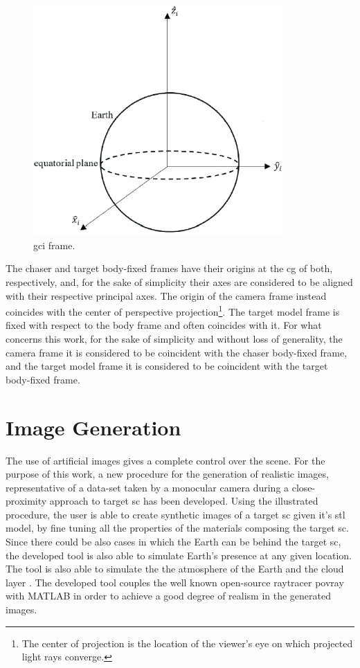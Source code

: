 \begin{figure}[htbp]
  \centering
  \includegraphics[width=0.85\textwidth]{gfx/eci.eps}
  \caption{\acrfull{gci} frame.}
  \label{fig:gci}
\end{figure}

The chaser and target body-fixed frames have their origins at the \acrshort{cg} of both, respectively, and, for the sake of simplicity their axes are considered to be aligned with their respective principal axes. The origin of the camera frame instead coincides with the center of perspective projection\footnote{The center of projection is the location of the viewer's eye on which projected light rays converge.}. The target model frame is fixed with respect to the body frame and often coincides with it. For what concerns this work, for the sake of simplicity and without loss of generality, the camera frame it is considered to be coincident with the chaser body-fixed frame, and the target model frame it is considered to be coincident with the target body-fixed frame.

\section{Image Generation}
The use of artificial images gives a complete control over the scene. For the purpose of this work, a new procedure for the generation of realistic images, representative of a data-set taken by a monocular camera during a close-proximity approach to target \acrshort{sc} has been developed.
Using the illustrated procedure, the user is able to create synthetic images of a target \acrshort{sc} given it's \acrshort{stl} model, by fine tuning all the properties of the materials composing the target \acrshort{sc}.
Since there could be also cases in which the Earth can be behind the target \acrshort{sc}, the developed tool is also able to simulate Earth's presence at any given location. The tool is also able to simulate the the atmosphere of the Earth and the cloud layer \cite{jacopo}.
The developed tool couples the well known open-source raytracer \acrshort{povray} with MATLAB in order to achieve a good degree of realism in the generated images.

